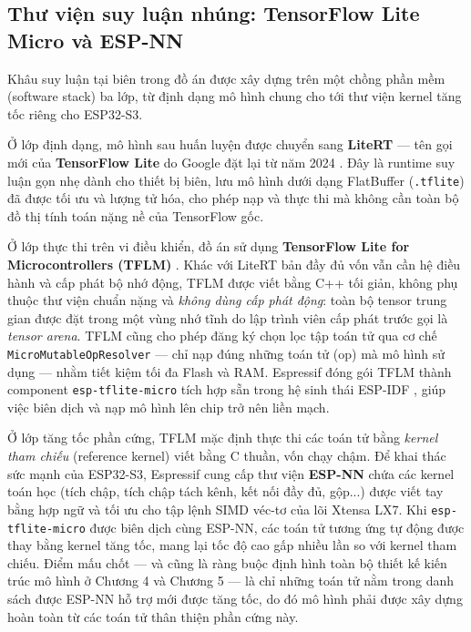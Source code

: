 \documentclass[../DoAn.tex]{subfiles}
\begin{document}
\subsection{Thư viện suy luận nhúng: TensorFlow Lite Micro và ESP-NN}
Khâu suy luận tại biên trong đồ án được xây dựng trên một chồng phần mềm (software stack) ba lớp, từ định dạng mô hình chung cho tới thư viện kernel tăng tốc riêng cho ESP32-S3.

Ở lớp định dạng, mô hình sau huấn luyện được chuyển sang \textbf{LiteRT} --- tên gọi mới của \textbf{TensorFlow Lite} do Google đặt lại từ năm 2024 \cite{google2024litert}. Đây là runtime suy luận gọn nhẹ dành cho thiết bị biên, lưu mô hình dưới dạng FlatBuffer (\texttt{.tflite}) đã được tối ưu và lượng tử hóa, cho phép nạp và thực thi mà không cần toàn bộ đồ thị tính toán nặng nề của TensorFlow gốc.

Ở lớp thực thi trên vi điều khiển, đồ án sử dụng \textbf{TensorFlow Lite for Microcontrollers (TFLM)} \cite{david2021tensorflowlite}. Khác với LiteRT bản đầy đủ vốn vẫn cần hệ điều hành và cấp phát bộ nhớ động, TFLM được viết bằng C++ tối giản, không phụ thuộc thư viện chuẩn nặng và \textit{không dùng cấp phát động}: toàn bộ tensor trung gian được đặt trong một vùng nhớ tĩnh do lập trình viên cấp phát trước gọi là \textit{tensor arena}. TFLM cũng cho phép đăng ký chọn lọc tập toán tử qua cơ chế \texttt{MicroMutableOpResolver} --- chỉ nạp đúng những toán tử (op) mà mô hình sử dụng --- nhằm tiết kiệm tối đa Flash và RAM. Espressif đóng gói TFLM thành component \texttt{esp-tflite-micro} tích hợp sẵn trong hệ sinh thái ESP-IDF \cite{espressif2024esptflitemicro}, giúp việc biên dịch và nạp mô hình lên chip trở nên liền mạch.

Ở lớp tăng tốc phần cứng, TFLM mặc định thực thi các toán tử bằng \textit{kernel tham chiếu} (reference kernel) viết bằng C thuần, vốn chạy chậm. Để khai thác sức mạnh của ESP32-S3, Espressif cung cấp thư viện \textbf{ESP-NN} \cite{espressif2023espnn} chứa các kernel toán học (tích chập, tích chập tách kênh, kết nối đầy đủ, gộp...) được viết tay bằng hợp ngữ và tối ưu cho tập lệnh SIMD véc-tơ của lõi Xtensa LX7. Khi \texttt{esp-tflite-micro} được biên dịch cùng ESP-NN, các toán tử tương ứng tự động được thay bằng kernel tăng tốc, mang lại tốc độ cao gấp nhiều lần so với kernel tham chiếu. Điểm mấu chốt --- và cũng là ràng buộc định hình toàn bộ thiết kế kiến trúc mô hình ở Chương 4 và Chương 5 --- là chỉ những toán tử nằm trong danh sách được ESP-NN hỗ trợ mới được tăng tốc, do đó mô hình phải được xây dựng hoàn toàn từ các toán tử thân thiện phần cứng này.
\end{document}
